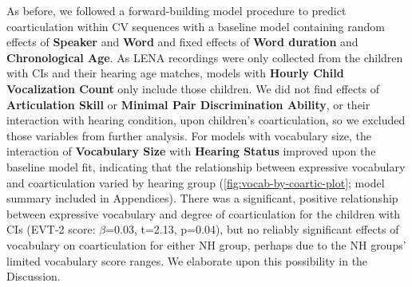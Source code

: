 \documentclass[
]{article}
\begin{document}
As before, we followed a forward-building model procedure to predict coarticulation within CV sequences with a baseline model containing random effects of \textbf{Speaker} and \textbf{Word} and fixed effects of \textbf{Word duration} and \textbf{Chronological Age}. As LENA recordings were only collected from the children with CIs and their hearing age matches, models with \textbf{Hourly Child Vocalization Count} only include those children. We did not find effects of \textbf{Articulation Skill} or \textbf{Minimal Pair Discrimination Ability}, or their interaction with hearing condition, upon children's coarticulation, so we excluded those variables from further analysis. For models with vocabulary size, the interaction of \textbf{Vocabulary Size} with \textbf{Hearing Status} improved upon the baseline model fit, indicating that the relationship between expressive vocabulary and coarticulation varied by hearing group (\ref{fig:vocab-by-coartic-plot}; model summary included in Appendices). There was a significant, positive relationship between expressive vocabulary and degree of coarticulation for the children with CIs (EVT-2 score: \(\beta\)=0.03, t=2.13, p=0.04), but no reliably significant effects of vocabulary on coarticulation for either NH group, perhaps due to the NH groups' limited vocabulary score ranges. We elaborate upon this possibility in the Discussion.
\end{document}
